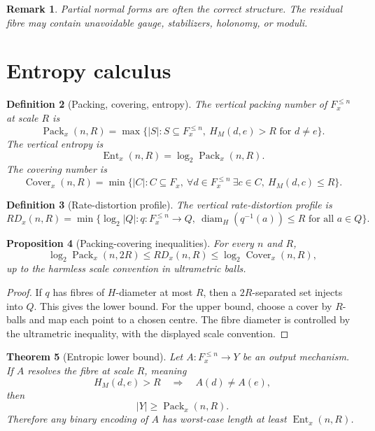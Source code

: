 \documentclass[11pt]{article}
\newtheorem{theorem}{Theorem}[section]
\newtheorem{proposition}[theorem]{Proposition}
\newtheorem{definition}[theorem]{Definition}
\newtheorem{remark}[theorem]{Remark}
\DeclareMathOperator{\diam}{diam}
\DeclareMathOperator{\Ent}{Ent}
\DeclareMathOperator{\Pack}{Pack}
\DeclareMathOperator{\Cover}{Cover}
\begin{document}
\begin{remark}
Partial normal forms are often the correct structure.  The residual fibre may contain unavoidable gauge, stabilizers, holonomy, or moduli.
\end{remark}

\section{Entropy calculus}

\begin{definition}[Packing, covering, entropy]
The vertical packing number of \(F_x^{\le n}\) at scale \(R\) is
\[
\Pack_x(n,R)=
\max\{|S|:S\subseteq F_x^{\le n},\ H_M(d,e)>R\text{ for }d\ne e\}.
\]
The vertical entropy is
\[
\Ent_x(n,R)=\log_2\Pack_x(n,R).
\]
The covering number is
\[
\Cover_x(n,R)=
\min\{|C|:C\subseteq F_x,\ \forall d\in F_x^{\le n}\ \exists c\in C,\ H_M(d,c)\le R\}.
\]
\end{definition}

\begin{definition}[Rate-distortion profile]
The vertical rate-distortion profile is
\[
RD_x(n,R)=
\min\{\log_2|Q|:q:F_x^{\le n}\to Q,\ \diam_H(q^{-1}(a))\le R\text{ for all }a\in Q\}.
\]
\end{definition}

\begin{proposition}[Packing-covering inequalities]
For every \(n\) and \(R\),
\[
\log_2\Pack_x(n,2R)\le RD_x(n,R)\le \log_2\Cover_x(n,R),
\]
up to the harmless scale convention in ultrametric balls.
\end{proposition}

\begin{proof}
If \(q\) has fibres of \(H\)-diameter at most \(R\), then a \(2R\)-separated set injects into \(Q\).  This gives the lower bound.  For the upper bound, choose a cover by \(R\)-balls and map each point to a chosen centre.  The fibre diameter is controlled by the ultrametric inequality, with the displayed scale convention.
\end{proof}

\begin{theorem}[Entropic lower bound]
Let \(A:F_x^{\le n}\to Y\) be an output mechanism.  If \(A\) resolves the fibre at scale \(R\), meaning
\[
H_M(d,e)>R\quad\Longrightarrow\quad A(d)\ne A(e),
\]
then
\[
|Y|\ge\Pack_x(n,R).
\]
Therefore any binary encoding of \(A\) has worst-case length at least \(\Ent_x(n,R)\).
\end{theorem}
\end{document}
